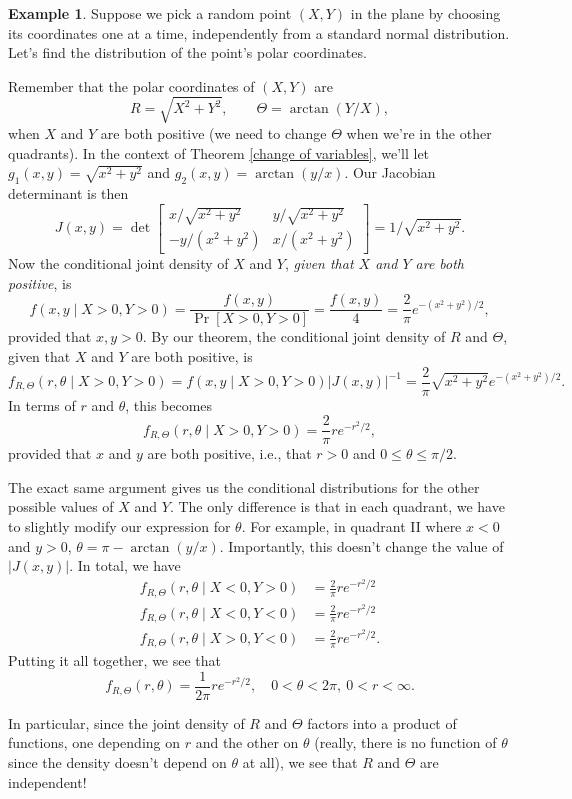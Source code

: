\documentclass[12pt]{article}
\theoremstyle{plain}
\theoremstyle{definition}
\newtheorem{example}[theorem]{Example}
\theoremstyle{remark}
\begin{document}
\begin{example}
    Suppose we pick a random point $(X,Y)$ in the plane by choosing its coordinates one at a time, independently from a standard normal distribution.
    Let's find the distribution of the point's polar coordinates.

    Remember that the polar coordinates of $(X, Y)$ are
    \[
        R = \sqrt{X^2+Y^2},\qquad \Theta = \arctan (Y/X),
    \]
    when $X$ and $Y$ are both positive (we need to change $\Theta$ when we're in the other quadrants).
    In the context of Theorem \ref{change of variables}, we'll let $g_1(x,y) = \sqrt{x^2+y^2}$ and $g_2(x,y) = \arctan (y/x)$.
    Our Jacobian determinant is then
    \[
        J(x,y) = \det \begin{bmatrix}
            x/\sqrt{x^2+y^2} & y/\sqrt{x^2+y^2}\\
            -y/(x^2+y^2) & x/(x^2+y^2)
        \end{bmatrix} = 1/\sqrt{x^2+y^2}.
    \]
    Now the conditional joint density of $X$ and $Y$, \emph{given that $X$ and $Y$ are both positive}, is
    \[
        f(x,y\mid X>0, Y>0) = \frac{f(x,y)}{\Pr[X>0, Y>0]} = \frac{f(x,y)}{4} = \frac{2}{\pi}e^{-(x^2+y^2)/2},
    \]
    provided that $x,y>0$.
    By our theorem, the conditional joint density of $R$ and $\Theta$, given that $X$ and $Y$ are both positive, is
    \[
        f_{R, \Theta}(r, \theta\mid X>0, Y>0) = f(x,y\mid X>0, Y>0)|J(x,y)|^{-1} = \frac{2}{\pi}\sqrt{x^2+y^2}e^{-(x^2+y^2)/2}.
    \]
    In terms of $r$ and $\theta$, this becomes
    \[
        f_{R, \Theta}(r, \theta\mid X>0, Y>0) = \frac{2}{\pi}re^{-r^2/2},
    \]
    provided that $x$ and $y$ are both positive, i.e., that $r>0$ and $0\leq \theta \leq \pi/2$.

    The exact same argument gives us the conditional distributions for the other possible values of $X$ and $Y$.
    The only difference is that in each quadrant, we have to slightly modify our expression for $\theta$.
    For example, in quadrant II where $x<0$ and $y>0$, $\theta = \pi- \arctan (y/x)$.
    Importantly, this doesn't change the value of $|J(x,y)|$.
    In total, we have
    \begin{align*}
        f_{R, \Theta}(r, \theta\mid X<0, Y>0) &= \frac{2}{\pi}re^{-r^2/2}\\
        f_{R, \Theta}(r, \theta\mid X<0, Y<0) &= \frac{2}{\pi}re^{-r^2/2}\\
        f_{R, \Theta}(r, \theta\mid X>0, Y<0) &= \frac{2}{\pi}re^{-r^2/2}.
    \end{align*}
    Putting it all together, we see that
    \[
        f_{R, \Theta}(r,\theta) = \frac{1}{2\pi}re^{-r^2/2},\quad 0<\theta<2\pi,\ 0<r<\infty.
    \]

    In particular, since the joint density of $R$ and $\Theta$ factors into a product of functions, one depending on $r$ and the other on $\theta$ (really, there is no function of $\theta$ since the density doesn't depend on $\theta$ at all), we see that $R$ and $\Theta$ are independent!
\end{example}
\end{document}
